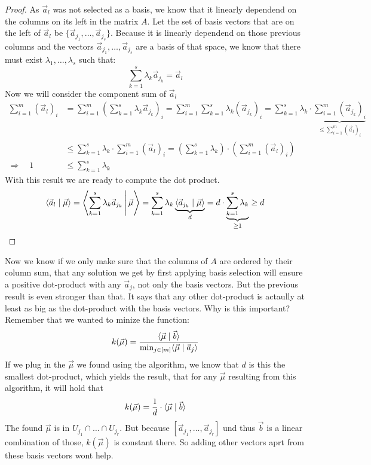 \begin{proof}
    As $\vec a_l$ was not selected as a basis, we know that it linearly dependend on the columns on its left in the matrix $A$. Let the set of basis vectors that are on the left of $\vec a_l$ be $\{\vec a_{j_1}, \dots, \vec a_{j_s}\}$. Because it is linearly dependend on those previous columns and the vectors $\vec a_{j_1}, \dots, \vec a_{j_s}$ are a basis of that space, we know that there must exist $\lambda_1, \dots, \lambda_s$ such that:
    $$\sum_{k=1}^{s}\lambda_k \vec a_{j_k} = \vec a_l$$
    Now we will consider the component sum of $\vec a_l$
    \begin{align*}
        \sum_{i=1}^{m} (\vec a_l)_i &= \sum_{i=1}^{m} \left(\sum_{k=1}^{s}\lambda_k \vec a_{j_k}\right)_i = \sum_{i=1}^{m} \sum_{k=1}^{s}\lambda_k \left(\vec a_{j_k}\right)_i = \sum_{k=1}^{s} \lambda_k \cdot\underbrace{\sum_{i=1}^{m} \left(\vec a_{j_k}\right)_i}_{\leq \sum_{i=1}^{m} (\vec a_l)_i}\\
        &\leq \sum_{k=1}^{s} \lambda_k \cdot\sum_{i=1}^{m} (\vec a_l)_i = \left(\sum_{k=1}^{s} \lambda_k\right) \cdot\left(\sum_{i=1}^{m} (\vec a_l)_i\right)\\
        \Rightarrow\quad 1 &\leq \sum_{k=1}^{s} \lambda_k
    \end{align*}
    With this result we are ready to compute the dot product.
    $$\langle \vec a_l \mid \vec\mu \rangle = \left\langle \sum_{k=1}^{s}\lambda_k \vec a_{j_k} \,\middle|\, \vec\mu \right\rangle = \sum_{k=1}^{s}\lambda_k \underbrace{\langle \vec a_{j_k} \mid \vec\mu \rangle}_d = d\cdot \underbrace{\sum_{k=1}^{s}\lambda_k}_{\geq 1} \geq d$$
\end{proof}

Now we know if we only make sure that the columns of $A$ are ordered by their column sum, that any solution we get by first applying basis selection will ensure a positive dot-product with any $\vec a_j$, not only the basis vectors. But the previous result is even stronger than that. It says that any other dot-product is actaully at least as big as the dot-product with the basis vectors. Why is this important? Remember that we wanted to minize the function:
$$k(\vec \mu) = \frac{\langle \vec{\mu} \mid \vec b \rangle}{\min_{j \in [m]}\langle \vec\mu \mid \vec a_j \rangle}$$
If we plug in the $\vec\mu$ we found using the algorithm, we know that $d$ is this the smallest dot-product, which yields the result, that for any $\vec\mu$ resulting from this algorithm, it will hold that
$$k(\vec \mu) = \frac{1}{d}\cdot\langle \vec{\mu} \mid \vec b \rangle$$
The found $\vec\mu$ is in $U_{j_1} \cap \dots \cap U_{j_r}$. But because $[\vec a_{j_1}, \dots, \vec a_{j_r}]$ und thus $\vec b$ is a linear combination of those, $k(\vec\mu)$ is constant there. So adding other vectors aprt from these basis vectors wont help.

